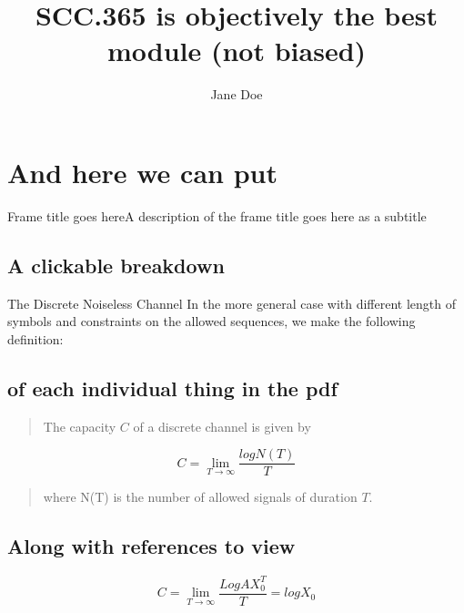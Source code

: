 \documentclass[]{beamer}
\title{SCC.365 is objectively the best module (not biased)}
\author{Jane Doe}
\begin{document}
\maketitle
\section{And here we can put}
\begin{frame}[t]{Frame title goes here}{A description of the frame title goes here as a subtitle}
  \subsection{A clickable breakdown}
  \begin{exampleblock}{The Discrete Noiseless Channel}
    In the more general case with different length of symbols and constraints on the allowed sequences, we make the following definition:
    \subsection{of each individual thing in the pdf}
    \begin{quote}
      The capacity $C$ of a discrete channel is given by
    \end{quote}
    \[ C = \lim_{T \to \infty}  \frac{logN(T)}{T}\]

    \begin{quote}
    where N(T) is the number of allowed signals of duration $T$.
  \end{quote}
\end{exampleblock}
\subsection{Along with references to view}
  \begin{theorem}
    \[C = \lim_{T \to \infty}\frac{LogAX^{T}_{0}}{T} = logX_{0}\]
  \end{theorem}
\end{frame}
\end{document}
